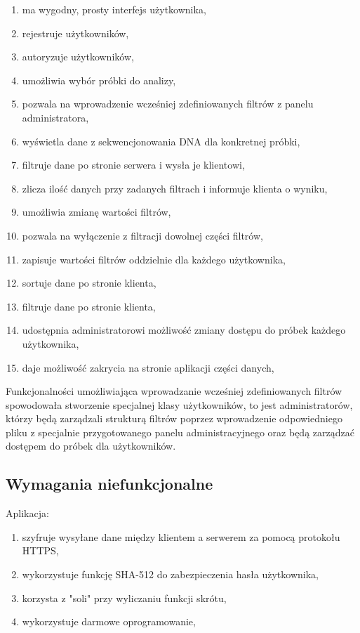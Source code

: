 \documentclass[a4paper,12pt,twoside]{article}
\begin{document}
 \begin{enumerate}[1)]
 \item ma wygodny, prosty interfejs użytkownika,
 \item rejestruje użytkowników,
 \item autoryzuje użytkowników,
 \item umożliwia wybór próbki do analizy,
 \item pozwala na wprowadzenie wcześniej zdefiniowanych filtrów z panelu administratora,
 \item wyświetla dane z sekwencjonowania DNA dla konkretnej próbki,
 \item filtruje dane po stronie serwera i wysła je klientowi,
 \item zlicza ilość danych przy zadanych filtrach i informuje klienta o wyniku,
 \item umożliwia zmianę wartości filtrów,
 \item pozwala na wyłączenie z filtracji dowolnej części filtrów,
 \item zapisuje wartości filtrów oddzielnie dla każdego użytkownika,
 \item sortuje dane po stronie klienta,
 \item filtruje dane po stronie klienta,
 \item udostępnia administratorowi możliwość zmiany dostępu do próbek 
 każdego użytkownika,
 \item daje możliwość zakrycia na stronie aplikacji części danych,	
 \end{enumerate}
 
\newpage

Funkcjonalności umożliwiająca wprowadzanie wcześniej zdefiniowanych filtrów spowodowała stworzenie
specjalnej klasy użytkowników, to jest administratorów, którzy będą zarządzali strukturą filtrów poprzez wprowadzenie odpowiedniego pliku z specjalnie przygotowanego panelu administracyjnego
oraz będą zarządzać dostępem do próbek dla użytkowników.

\subsection{Wymagania niefunkcjonalne}
Aplikacja:
 \begin{enumerate}[1)]
  \item szyfruje wysyłane dane między klientem a serwerem za pomocą protokołu HTTPS,
  \item wykorzystuje funkcję SHA-512\cite{sha} do zabezpieczenia hasła użytkownika,
  \item korzysta z "soli" przy wyliczaniu funkcji skrótu,
  \item wykorzystuje darmowe oprogramowanie,
 \end{enumerate}
\end{document}

